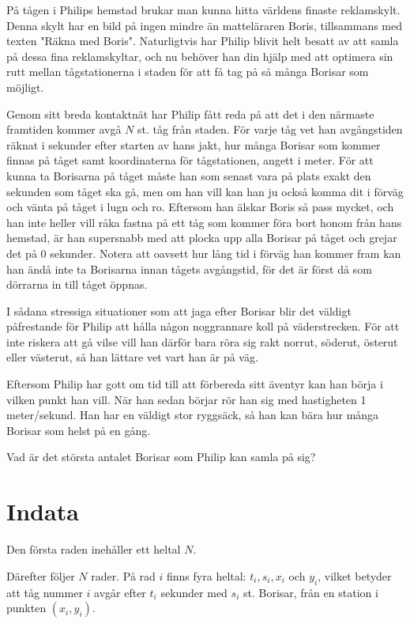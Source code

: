 
På tågen i Philips hemstad brukar man kunna hitta världens finaste reklamskylt. Denna skylt har en bild på ingen mindre än matteläraren Boris, tillsammans med texten "Räkna med Boris". 
Naturligtvis har Philip blivit helt besatt av att samla på dessa fina reklamskyltar, och nu behöver han din hjälp med att optimera sin rutt mellan tågstationerna i staden för att få tag på så många Borisar som möjligt.

Genom sitt breda kontaktnät har Philip fått reda på att det i den närmaste framtiden kommer avgå $N$ st. tåg från staden. För varje tåg vet han avgångstiden räknat i sekunder efter starten av hans jakt, hur många Borisar som kommer finnas på tåget samt koordinaterna för tågstationen, angett i meter. 
För att kunna ta Borisarna på tåget måste han som senast vara på plats exakt den sekunden som tåget ska gå, men om han vill kan han ju också komma dit i förväg och vänta på tåget i lugn och ro.
Eftersom han älskar Boris så pass mycket, och han inte heller vill råka fastna på ett tåg som kommer föra bort honom från hans hemstad, är han supersnabb med att plocka upp alla Borisar på tåget och grejar det på 0 sekunder. 
Notera att oavsett hur lång tid i förväg han kommer fram kan han ändå inte ta Borisarna innan tågets avgångstid, för det är först då som dörrarna in till tåget öppnas.

I sådana stressiga situationer som att jaga efter Borisar blir det väldigt påfrestande för Philip att hålla någon noggrannare koll på väderstrecken. För att inte riskera att gå vilse vill han därför bara röra sig rakt norrut, söderut, österut eller västerut, så han lättare vet vart han är på väg.

Eftersom Philip har gott om tid till att förbereda sitt äventyr kan han börja i vilken punkt han vill. När han sedan börjar rör han sig med hastigheten 1 meter/sekund. Han har en väldigt stor ryggsäck, så han kan bära hur många Borisar som helst på en gång.

Vad är det största antalet Borisar som Philip kan samla på sig?

\section*{Indata}
Den första raden inehåller ett heltal $N$. 

Därefter följer $N$ rader. På rad $i$ finns fyra heltal: $t_{i}, s_{i}, x_{i}$ och $y_{i}$, vilket betyder att tåg nummer $i$ avgår efter $t_{i}$ sekunder med $s_{i}$ st. Borisar, från en station i punkten $(x_{i},y_{i})$.

